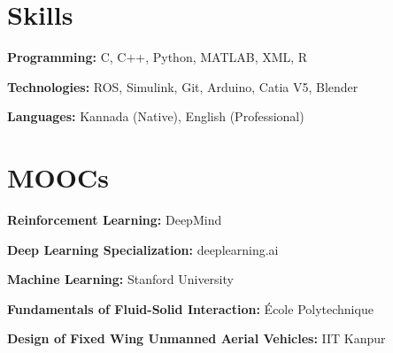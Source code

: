 \documentclass[letterpaper,11pt]{article}
\newcommand{\resumeSubHeadingListStart}{\begin{itemize}[leftmargin=0.15in, label={}]}
\newcommand{\resumeSubHeadingListEnd}{\end{itemize}}
\begin{document}

\section{Skills}
  \vspace{2pt}
  \resumeSubHeadingListStart
    \small{\item{
        \textbf{Programming:}{ C, C++, Python, MATLAB, XML, R} \\ \vspace{3pt}
        
        \textbf{Technologies:}{ ROS, Simulink, Git, Arduino, Catia V5, Blender} \\ \vspace{3pt}
        
        \textbf{Languages:}{ Kannada (Native), English (Professional)}
    }}
  \resumeSubHeadingListEnd




\section{MOOCs}
  \vspace{2pt}
  \resumeSubHeadingListStart
    \small{\item{
        \textbf{Reinforcement Learning:}{ DeepMind} \\ \vspace{3pt}
        
        \textbf{Deep Learning Specialization:}{ deeplearning.ai} \\ \vspace{3pt}
        
        \textbf{Machine Learning:}{ Stanford University} \\ \vspace{3pt}
        
        \textbf{Fundamentals of Fluid-Solid Interaction: }{ École Polytechnique} \\ \vspace{3pt}
        
        \textbf{Design of Fixed Wing Unmanned Aerial Vehicles:}{ IIT Kanpur} 
    }}
  \resumeSubHeadingListEnd




    
\end{document}
